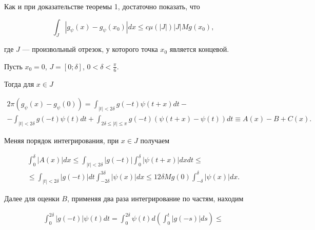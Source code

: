 \begin{pf}


Как и при доказательстве теоремы 1, достаточно показать, что


\begin{equation}


\int_J|g_\psi(x)-g_\psi(x_0)|dx\le c\mu(|J|)|J|Mg(x_0),


\end{equation}


где $J$ --- произвольный отрезок, у которого точка $x_0$ является концевой.





Пусть $x_0=0$, $J=[0;\delta]$, $0<\delta<\frac{\pi}{6}$.


Тогда для $x\in J$


\begin{multline*}


2\pi(g_\psi(x)-g_\psi(0))=\int_{|t|<2\delta}g(-t)\psi(t+x)dt- \\


%


-\int_{|t|<2\delta}g(-t)\psi(t)dt+


\int_{2\delta\le |t|\le\pi}g(-t)(\psi(t+x)-\psi(t))dt\equiv A(x)-B+C(x).


\end{multline*}


Меняя порядок интегрирования, при $x\in J$ получаем


\begin{multline*}


\int_0^\delta|A(x)|dx\le\int_{|t|<2\delta}|g(-t)|


\int_0^\delta|\psi(t+x)|dxdt\le \\


%


\le\int_{|t|<2\delta}|g(-t)|dt\int_{-2\delta}^{3\delta}|\psi(x)|dx\le


12\delta Mg(0)\int_{-\delta}^\delta|\psi(x)|dx.


\end{multline*}


Далее для оценки $B$, применяя два раза интегрирование по частям, находим


\begin{multline*}


\int_0^{2\delta}|g(-t)|\psi(t)dt=\int_0^{2\delta}\psi(t)d\left(\int_0^t


|g(-s)|ds\right)\le \\



\end{multline*}
\end{pf}

